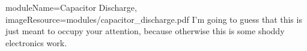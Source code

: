 \begin{needymodule}{
  moduleName=Capacitor Discharge,
  imageResource=modules/capacitor_discharge.pdf
}
{
  I'm going to guess that this is just meant to occupy your attention, because otherwise this is some shoddy electronics work.
}
  \begin{bulletlist}
  \end{bulletlist}

\end{needymodule}
